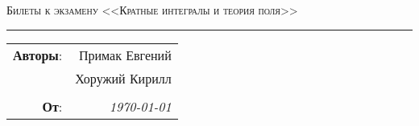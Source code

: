 
\begin{center}
    \LARGE \textsc{Билеты к экзамену <<Кратные интегралы и теория поля>>}
\end{center}

\hrule

\phantom{42}

\begin{flushright}
    \begin{tabular}{rr}
        \textbf{Авторы}: 
        & Примак Евгений \\
        & Хоружий Кирилл \\
        &\\
        \textbf{От}: &
        \textit{\today}\\
    \end{tabular}
\end{flushright}

\thispagestyle{empty}
\tableofcontents
\newpage